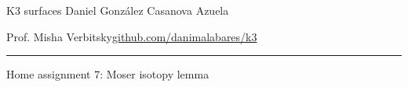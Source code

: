 

\usepackage[style=authortitle-terse,backend=bibtex]{biblatex}


\setcounter{secnumdepth}{2}



\begin{minipage}{\textwidth}
	\begin{minipage}{1\textwidth}
		K3 surfaces \hfill Daniel González Casanova Azuela
		
		{\small Prof. Misha Verbitsky\hfill\href{https://github.com/danimalabares/k3}{github.com/danimalabares/k3}}
	\end{minipage}
\end{minipage}\vspace{.2cm}\hrule

\vspace{10pt}
{\huge Home assignment 7: Moser isotopy lemma}

